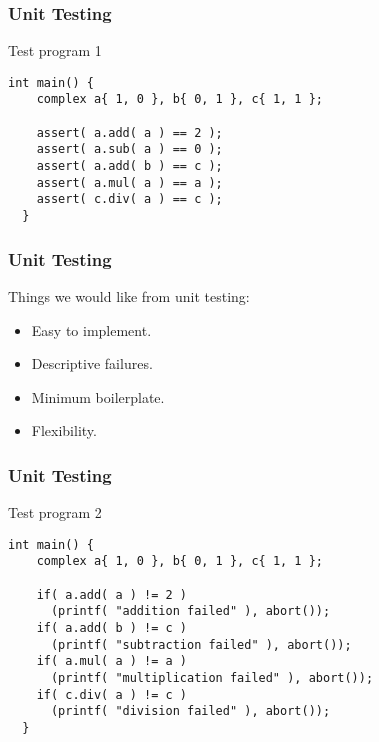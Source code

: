 \begin{frame}[fragile]
  \frametitle{Unit Testing}
  \begin{block}{Test program 1}
    \begin{lstlisting}[style=C]
  int main() {
    complex a{ 1, 0 }, b{ 0, 1 }, c{ 1, 1 };

    assert( a.add( a ) == 2 );
    assert( a.sub( a ) == 0 );
    assert( a.add( b ) == c );
    assert( a.mul( a ) == a );
    assert( c.div( a ) == c );
  }
    \end{lstlisting}
  \end{block}
\end{frame}

\begin{frame}[fragile]
  \frametitle{Unit Testing}
  Things we would like from unit testing:
  \begin{itemize}
  \vspace{0.5cm}
  \item Easy to implement.
  \vspace{0.5cm}
  \item Descriptive failures.
  \vspace{0.5cm}
  \item Minimum boilerplate.
  \vspace{0.5cm}
  \item Flexibility.
  \end{itemize}
\end{frame}

\begin{frame}[fragile]
  \frametitle{Unit Testing}
  \begin{block}{Test program 2}
    \begin{lstlisting}[style=C]
  int main() {
    complex a{ 1, 0 }, b{ 0, 1 }, c{ 1, 1 };

    if( a.add( a ) != 2 )
      (printf( "addition failed" ), abort());
    if( a.add( b ) != c )
      (printf( "subtraction failed" ), abort());
    if( a.mul( a ) != a )
      (printf( "multiplication failed" ), abort());
    if( c.div( a ) != c )
      (printf( "division failed" ), abort());
  }
    \end{lstlisting}
  \end{block}
\end{frame}

